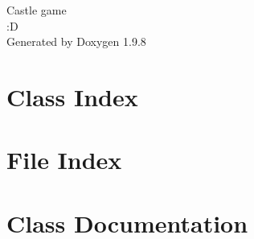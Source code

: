 \documentclass[twoside]{book}
\newcommand{\+}{\discretionary{\mbox{\scriptsize$\hookleftarrow$}}{}{}}
\newcommand{\clearemptydoublepage}{%
    \newpage{\pagestyle{empty}\cleardoublepage}%
  }
\begin{document}
  \raggedbottom
    \hypersetup{pageanchor=false,
                bookmarksnumbered=true,
                pdfencoding=unicode
               }
  \begin{titlepage}
  \vspace*{7cm}
  \begin{center}%
  {\Large Castle game}\\
  [1ex]\large \+:D \\
  \vspace*{1cm}
  {\large Generated by Doxygen 1.9.8}\\
  \end{center}
  \end{titlepage}
  \clearemptydoublepage
  \tableofcontents
  \clearemptydoublepage
  \hypersetup{pageanchor=true}

\chapter{Class Index}

\chapter{File Index}

\chapter{Class Documentation}












\end{document}
